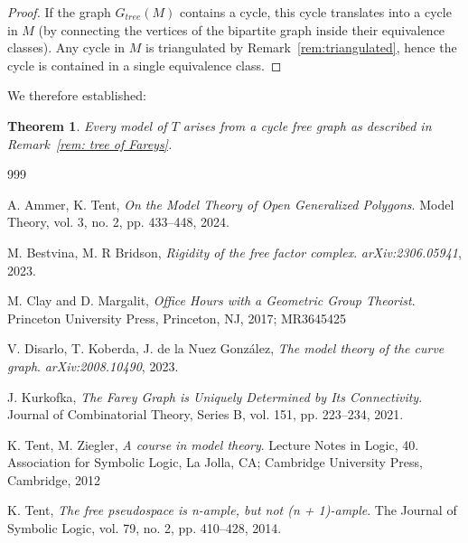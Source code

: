 \documentclass[10pt,a4paper]{amsart}
\newtheorem{theorem}[defi]{Theorem}
\begin{document}
\begin{proof}
    If the graph $G_{tree}(M)$ contains a cycle, this cycle translates into a cycle in $M$ (by connecting the vertices  of
    the bipartite graph inside their equivalence classes). Any cycle in $M$ is
    triangulated by Remark~\ref{rem:triangulated}, hence the cycle is contained in a single equivalence class.    
\end{proof}

We therefore established:

\begin{theorem}\label{thm:classification}
Every model of $T$ arises from a cycle free graph as described in Remark~\ref{rem: tree of Fareys}.
\end{theorem}

\begin{thebibliography}{999}

 
  A. Ammer, K. Tent, \emph{On the Model Theory of Open Generalized Polygons}. Model Theory, vol. 3, no. 2, pp. 433--448, 2024. 


 M. Bestvina, M. R Bridson, \emph{Rigidity of the free factor complex}. \textit{arXiv:2306.05941}, 2023. 

 M. Clay and D. Margalit, \emph{Office Hours with a Geometric Group Theorist}. Princeton University Press, Princeton, NJ, 2017; MR3645425


 V. Disarlo, T. Koberda, J. de la Nuez González, \emph{The model theory of the curve graph}. \textit{arXiv:2008.10490}, 2023.

J. Kurkofka, 
\emph{The Farey Graph is Uniquely Determined by Its Connectivity}. 
Journal of Combinatorial Theory, Series B, 
vol. 151, pp. 223–234, 2021. 

 K. Tent, M. Ziegler, \emph{A course in model theory}. Lecture Notes in Logic, 40. Association for Symbolic Logic, La Jolla, CA; Cambridge University Press, Cambridge, 2012
		
 K. Tent, \emph{The free pseudospace is n-ample, but not (n + 1)-ample}. The Journal of Symbolic Logic, 
vol. 79, no. 2, pp. 410–428, 2014. 

\end{thebibliography}
\end{document}
